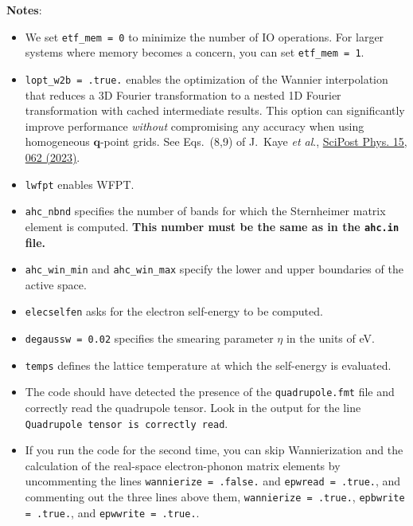 \documentclass[a4paper,11pt,serif]{article}
\newcommand{\mb}[1]{\mathbf{#1}}
\begin{document}
\begin{footnotesize}
{\bf Notes}:
\begin{itemize}
   \item We set \texttt{etf\_mem = 0} to minimize the number of IO operations. For larger systems where memory becomes a concern, you can set \texttt{etf\_mem = 1}.
   \item \texttt{lopt\_w2b = .true.} enables the optimization of the Wannier interpolation that reduces a 3D Fourier transformation to a nested 1D Fourier transformation with cached intermediate results. This option can significantly improve performance \textit{without} compromising any accuracy when using homogeneous $\mb{q}$-point grids. See Eqs.~(8,9) of J.\ Kaye \textit{et al}., \href{https://scipost.org/SciPostPhys.15.2.062}{SciPost Phys. 15, 062 (2023)}.
   \item \texttt{lwfpt} enables WFPT.
   \item \texttt{ahc\_nbnd} specifies the number of bands for which the Sternheimer matrix element is computed. \textbf{This number must be the same as in the \texttt{ahc.in} file.}
   \item \texttt{ahc\_win\_min} and \texttt{ahc\_win\_max} specify the lower and upper boundaries of the active space.
   \item \texttt{elecselfen} asks for the electron self-energy to be computed.
   \item \texttt{degaussw = 0.02} specifies the smearing parameter $\eta$ in the units of eV.
   \item \texttt{temps} defines the lattice temperature at which the self-energy is evaluated.
   \item The code should have detected the presence of the \texttt{quadrupole.fmt} file and correctly read the quadrupole tensor. Look in the output for the line \texttt{Quadrupole tensor is correctly read}.
   \item If you run the code for the second time, you can skip Wannierization and the calculation of the real-space electron-phonon matrix elements by uncommenting the lines \texttt{wannierize = .false.} and \texttt{epwread = .true.}, and commenting out the three lines above them, \texttt{wannierize = .true.}, \texttt{epbwrite = .true.}, and \texttt{epwwrite = .true.}.
\end{itemize}
\end{footnotesize}

\vspace{0.5cm}
\end{document}
